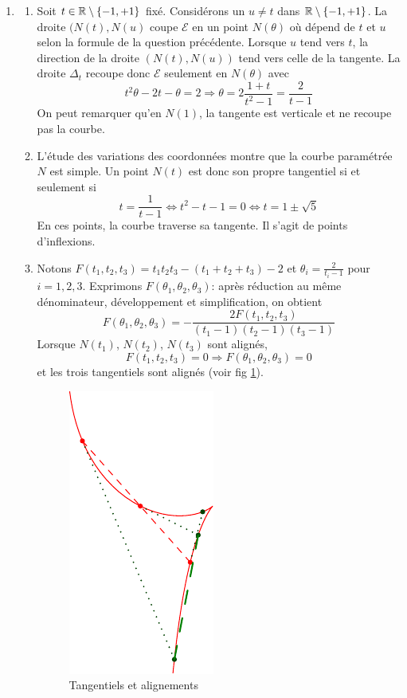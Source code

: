 \begin{enumerate}
 \item
\begin{enumerate}
 \item Soit $t\in \mathbb{R}\setminus\{-1,+1\}$ fixé. Considérons un $u\neq t$ dans $\mathbb{R}\setminus\{-1,+1\}$. La droite $(N(t),N(u)$ coupe $\mathcal E$ en un point $N(\theta)$ où dépend de $t$ et $u$ selon la formule de la question précédente. Lorsque $u$ tend vers $t$, la direction de la droite $(N(t),N(u))$ tend vers celle de la tangente. La droite $\Delta_t$ recoupe donc $\mathcal{E}$ seulement en $N(\theta)$ avec 
\begin{displaymath}
 t^2\theta - 2t -\theta = 2 \Rightarrow
\theta = 2\frac{1+t}{t^2-1}=\frac{2}{t-1} 
\end{displaymath}
On peut remarquer qu'en $N(1)$, la tangente est verticale et ne recoupe pas la courbe.
 \item L'étude des variations des coordonnées montre que la courbe paramétrée $N$ est simple. Un point $N(t)$ est donc son propre tangentiel si et seulement si
\begin{displaymath}
 t=\frac{1}{t-1}\Leftrightarrow t^2-t-1=0\Leftrightarrow t=1\pm\sqrt{5}
\end{displaymath}
En ces points, la courbe traverse sa tangente. Il s'agit de points d'inflexions.
 \item Notons $F(t_1,t_2,t_3) = t_1t_2t_3-(t_1+t_2+t_3)-2$ et $\theta_i = \frac{2}{t_i-1}$ pour $i=1,2,3$. Exprimons $F(\theta_1,\theta_2,\theta_3)$: après réduction au même dénominateur, développement et simplification, on obtient
\begin{displaymath}
 F(\theta_1,\theta_2,\theta_3) = -\frac{2F(t_1,t_2,t_3)}{(t_1-1)(t_2-1)(t_3-1)}
\end{displaymath}
Lorsque $N(t_1)$, $N(t_2)$, $N(t_3)$ sont alignés,
\begin{displaymath}
 F(t_1,t_2,t_3)=0 \Rightarrow F(\theta_1,\theta_2,\theta_3)=0
\end{displaymath}
et les trois tangentiels sont alignés (voir fig \ref{fig:Cpapota_2}).

\begin{figure}[h!t]
 \centering
 \includegraphics{./Cpapota_2.pdf}
 \caption{Tangentiels et alignements}
 \label{fig:Cpapota_2}
\end{figure}


\end{enumerate}
\end{enumerate}
